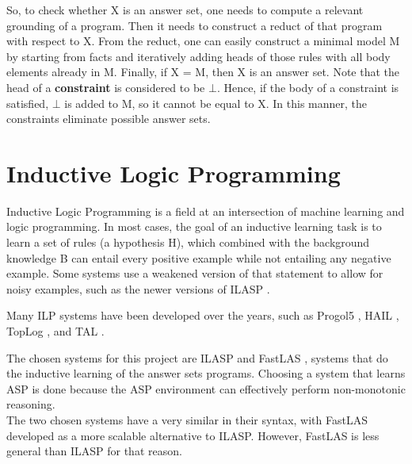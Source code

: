 So, to check whether X is an answer set, one needs to compute a relevant grounding of a program. Then it needs to construct a reduct of that program with respect to X.
From the reduct, one can easily construct a minimal model M by starting from facts and iteratively adding heads of those rules with all body elements already in M.
Finally, if X = M, then X is an answer set.
Note that the head of a \textbf{constraint} is considered to be $\bot$. 
Hence, if the body of a constraint is satisfied, $\bot$ is added to M, so it cannot be equal to X.
In this manner, the constraints eliminate possible answer sets.







\section{Inductive Logic Programming}
\label{ilasp-background}

Inductive Logic Programming \cite{RefWorks:RefID:42-muggleton1991inductive} is a field at an intersection of machine learning and logic programming.
In most cases, the goal of an inductive learning task is to learn a set of rules (a hypothesis H), which combined with the background knowledge B can entail every positive example while not entailing any negative example. 
Some systems use a weakened version of that statement to allow for noisy examples, such as the newer versions of ILASP \cite{RefWorks:RefID:55-law2018inductive}.

Many ILP systems have been developed over the years, such as Progol5 \cite{RefWorks:RefID:43-muggleton2000theory}, HAIL \cite{RefWorks:RefID:44-ray2003hybrid}, TopLog \cite{RefWorks:RefID:45-muggletontoplog:}, and TAL \cite{RefWorks:RefID:46-corapi2010inductive}.

The chosen systems for this project are ILASP \cite{RefWorks:RefID:18-law2020ilasp} and FastLAS \cite{RefWorks:RefID:19-law2020fastlas:}, systems that do the inductive learning of the answer sets programs.
Choosing a system that learns ASP is done because the ASP environment can effectively perform non-monotonic reasoning.\\

The two chosen systems have a very similar in their syntax, with FastLAS developed as a more scalable alternative to ILASP. 
However, FastLAS is less general than ILASP for that reason.

